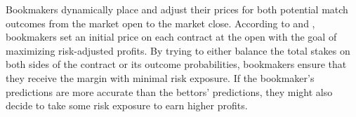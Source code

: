\documentclass[webpdf,modern,medium]{oup-authoring-template}
\theoremstyle{thmstyleone}%
\theoremstyle{thmstyletwo}%
\theoremstyle{thmstylethree}%
\begin{document}
Bookmakers dynamically place and adjust their prices for both potential match outcomes from the market open to the market close.
According to \citet{gandar1998} and \citet{moskowitz2021}, bookmakers set an initial price on each contract at the open with the goal of maximizing risk-adjusted profits. By trying to either balance the total stakes on both sides of the contract or its outcome probabilities, bookmakers ensure that they receive the margin with minimal risk exposure. If the bookmaker's predictions are more accurate than the bettors' predictions, they might also decide to take some risk exposure to earn higher profits.






\end{document}
